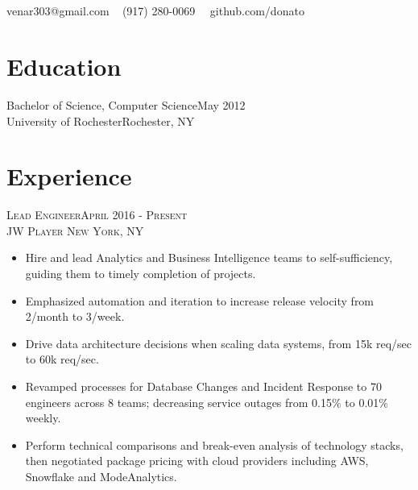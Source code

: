 \documentclass[oneside, final]{scrartcl}
\begin{document}
\begin{center}
 
\textsc{\LARGE{}}\\
\\
{\Large\Letter} venar303@gmail.com \ {\Large\Telefon} (917) 280-0069 \ \faGithub \ github.com/donato



\section{Education}
Bachelor of Science, Computer Science\hfill May 2012\\
University of Rochester\hfill Rochester, NY\\


\section{Experience}
\textsc{Lead Engineer\hfill April 2016 - Present\\}
\textsc{JW Player \hfill New York, NY\\}
\begin{itemize}
	\setlength{\itemsep}{1pt}
	\setlength{\parskip}{0pt}
	\setlength{\parsep}{0pt}
	\setlength{\leftmargin}{-5mm}
	\item Hire and lead Analytics and Business Intelligence teams to self-sufficiency, guiding them to timely completion of projects.
	\item Emphasized automation and iteration to increase release velocity from 2/month to 3/week.
	\item Drive data architecture decisions when scaling data systems, from 15k req/sec to 60k req/sec.
	\item Revamped processes for Database Changes and Incident Response to 70 engineers across 8 teams; decreasing service outages from 0.15\% to 0.01\% weekly.
	\item Perform technical comparisons and break-even analysis of technology stacks, then negotiated package pricing with cloud providers including AWS, Snowflake and ModeAnalytics.
\end{itemize}


\end{center}
\end{document}
